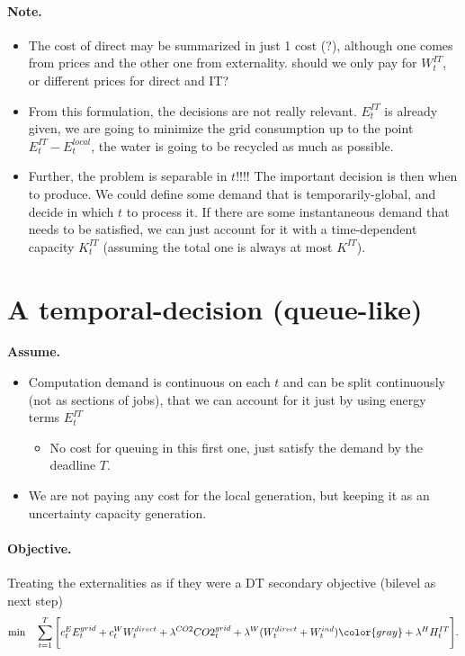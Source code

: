 \documentclass{article}
\begin{document}
\paragraph{Note.} 
\begin{itemize}
    \item 
The cost of direct may be summarized in just 1 cost (?), although one comes from prices and the other one from externality. {\color{red} should we only pay for $W_t^{IT}$, or different prices for direct and IT?}
\item From this formulation, the decisions are not really relevant. $E_t^{IT}$ is already given, we are going to minimize the grid consumption up to the point $E_t^{IT}-E_t^{local}$, the water is going to be recycled as much as possible. 
\item {\color{red}Further, the problem is separable in $t$!!!!} The important decision is then when to produce. We could define some demand that is temporarily-global, and decide in which $t$ to process it. If there are some instantaneous demand that needs to be satisfied, we can just account for it with a time-dependent capacity $K^{IT}_t$ (assuming the total one is always at most $K^{IT}$). 
\end{itemize}

\section{A temporal-decision (queue-like)}

\textbf{Assume.}
\begin{itemize}
    \item Computation demand is continuous on each $t$ and can be split continuously (not as sections of jobs), that we can account for it just by using energy terms $E_t^{IT}$
    \begin{itemize}
        \item No cost for queuing in this first one, just satisfy the demand by the deadline $T$. 
    \end{itemize}
    \item We are not paying any cost for the local generation, but keeping it as an uncertainty capacity generation.
    
\end{itemize}


\paragraph{Objective.} Treating the externalities as if they were a DT secondary objective (bilevel as next step)
\begin{align*}
\min \quad
    \sum_{t=1}^T \Bigg[
        c_t^E E_t^{grid}
        + c_t^W W_t^{direct}
        + \lambda^{CO2} CO2_t^{grid}
        + \lambda^W (W_t^{direct} + W_t^{ind})
        {\color{gray}+ \lambda^H H_t^{IT}}
    \Bigg].
\end{align*}
\end{document}
